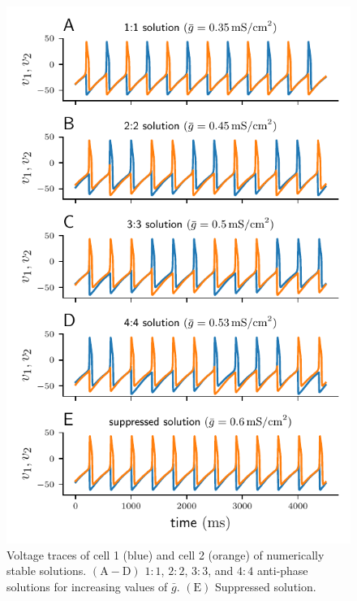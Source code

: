 \documentclass[utf8]{frontiersFPHY} %
\begin{document}
\begin{figure}[h!]
	\centering
	\includegraphics{burst-sols}
	\caption{Voltage traces of cell 1 (blue) and cell 2 (orange) of numerically stable solutions. $\bm{\mathrm{(A-D)}}$ $1:1$, $2:2$, $3:3$, and $4:4$ anti-phase solutions for increasing values of $\bar g$. $\bm{\mathrm{(E)}}$ Suppressed solution.~\label{fig:burst-sols}}
\end{figure}
\end{document}
